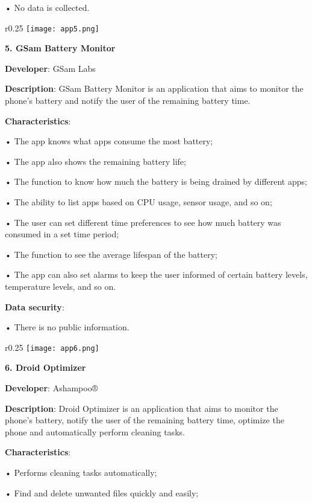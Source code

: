 • No data is collected.\newline

\begin{wrapfigure}{r}{0.25\textwidth} 
    \centering
    \texttt{[image: app5.png]}
\end{wrapfigure}

\noindent 
\textbf{5. GSam Battery Monitor }

\textbf{Developer}: GSam Labs

\textbf{Description}: GSam Battery Monitor is an application that aims to monitor the phone's battery and notify the user of the remaining battery time.

\textbf{Characteristics}:

• The app knows what apps consume the most battery;

• The app also shows the remaining battery life;

• The function to know how much the battery is being drained by different apps;

• The ability to list apps based on CPU usage, sensor usage, and so on;

• The user can set different time preferences to see how much battery was consumed in a set time period;

• The function to see the average lifespan of the battery;

• The app can also set alarms to keep the user informed of certain battery levels, temperature levels, and so on.

\textbf{Data security}:

• There is no public information.\newline

\begin{wrapfigure}{r}{0.25\textwidth} 
    \centering
    \texttt{[image: app6.png]}
\end{wrapfigure}

\noindent 
\textbf{6. Droid Optimizer }

\textbf{Developer}: Ashampoo®

\textbf{Description}: Droid Optimizer is an application that aims to monitor the phone's battery, notify the user of the remaining battery time, optimize the phone and automatically perform cleaning tasks.

\textbf{Characteristics}:

• Performs cleaning tasks automatically;

• Find and delete unwanted files quickly and easily;

